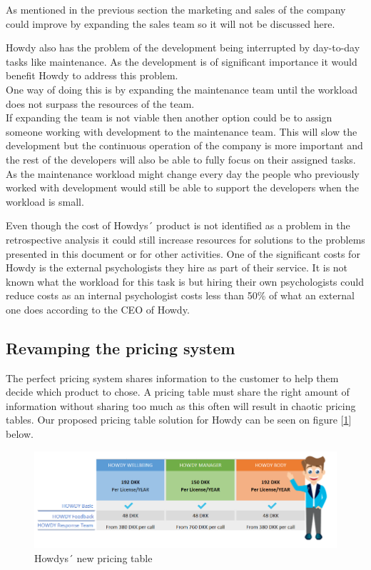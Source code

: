 \noindent As mentioned in the previous section the marketing and sales of the company could improve by expanding the sales team so it will not be discussed here.

\noindent Howdy also has the problem of the development being interrupted by day-to-day tasks like maintenance. As the development is of significant importance it would benefit Howdy to address this problem.\\
\noindent One way of doing this is by expanding the maintenance team until the workload does not surpass the resources of the team.\\
\noindent If expanding the team is not viable then another option could be to assign someone working with development to the maintenance team. This will slow the development but the continuous operation of the company is more important and the rest of the developers will also be able to fully focus on their assigned tasks. As the maintenance workload might change every day the people who previously worked with development would still be able to support the developers when the workload is small.

\noindent Even though the cost of Howdys´ product is not identified as a problem in the retrospective analysis it could still increase resources for solutions to the problems presented in this document or for other activities. One of the significant costs for Howdy is the external psychologists they hire as part of their service. It is not known what the workload for this task is but hiring their own psychologists could reduce costs as an internal psychologist costs less than 50\% of what an external one does according to the CEO of Howdy\cite{q&a}.

\subsection{Revamping the pricing system}
The perfect pricing system shares information to the customer to help them decide which product to chose. A pricing table must share the right amount of information without sharing too much as this often will result in chaotic pricing tables. Our proposed pricing table solution for Howdy can be seen on figure [\ref{pricingtable}] below.

\begin{figure}[H]
\centering
\includegraphics[scale=0.72]{figures/pricing_Howdy.png}
\caption{Howdys´ new pricing table}
\label{pricingtable}
\end{figure}

